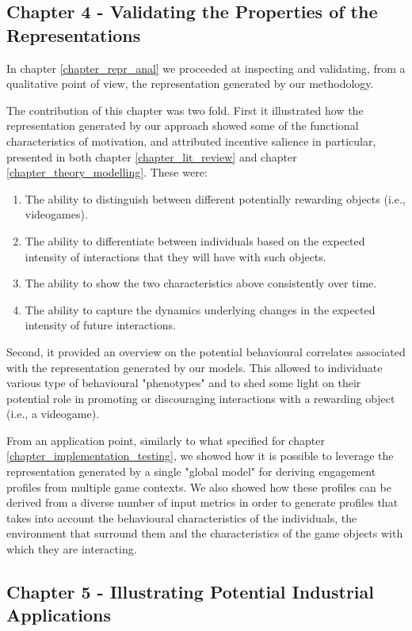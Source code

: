 \subsection{Chapter 4 - Validating the Properties of the Representations}
\label{discussion_chapter_four}
In chapter \ref{chapter_repr_anal} we proceeded at inspecting and validating, from a qualitative point of view, the representation generated by our methodology.

The contribution of this chapter was two fold. First it illustrated how the representation generated by our approach showed some of the functional characteristics of motivation, and attributed incentive salience in particular, presented in both chapter \ref{chapter_lit_review} and chapter \ref{chapter_theory_modelling}. These were:

\begin{enumerate}
    \item The ability to distinguish between different potentially rewarding objects (i.e., videogames).
    \item The ability to differentiate between individuals based on the expected intensity of interactions that they will have with such objects.
    \item The ability to show the two characteristics above consistently over time.
    \item The ability to capture the dynamics underlying changes in the expected intensity of future interactions.
\end{enumerate}

Second, it provided an overview on the potential behavioural correlates associated with the representation generated by our models. This allowed to individuate various type of behavioural "phenotypes" and to shed some light on their potential role in promoting or discouraging interactions with a rewarding object (i.e., a videogame).

From an application point, similarly to what specified for chapter \ref{chapter_implementation_testing}, we showed how it is possible to leverage the representation generated by a single "global model" for deriving engagement profiles from multiple game contexts. We also showed how these profiles can be derived from a diverse number of input metrics in order to generate profiles that takes into account the behavioural characteristics of the individuals, the environment that surround them and the characteristics of the game objects with which they are interacting.


\subsection{Chapter 5 - Illustrating Potential Industrial Applications}
\label{discussion_chapter_five}

